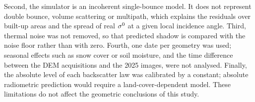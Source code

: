 Second, the simulator is an incoherent single-bounce model. It does not represent double bounce, volume scattering or multipath, which explains the residuals over built-up areas and the spread of real $\sigma^0$ at a given local incidence angle. Third, thermal noise was not removed, so that predicted shadow is compared with the noise floor rather than with zero. Fourth, one date per geometry was used; seasonal effects such as snow cover or soil moisture, and the time difference between the DEM acquisitions and the 2025 images, were not analysed. Finally, the absolute level of each backscatter law was calibrated by a constant; absolute radiometric prediction would require a land-cover-dependent model. These limitations do not affect the geometric conclusions of this study.
